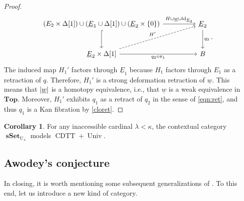 \documentclass[10pt,letterpaper,cm]{nupset}
\theoremstyle{definition}
\theoremstyle{theorem}
\newtheorem{corollary}[definition]{Corollary}
\theoremstyle{remark}
\newcommand{\0}{\mathbf{0}}
\newcommand{\1}{\mathbf{1}}
\newcommand{\2}{\mathbf{2}}
\DeclareMathOperator{\cdtt}{\mathrm{CDTT}}
\DeclareMathOperator{\univ}{\mathrm{Univ}}
\DeclareMathOperator{\sset}{\mathbf{sSet}}
\DeclareMathOperator{\idd}{id}
\begin{document}
\begin{proof}
\[\begin{tikzcd}[column sep=huge, row sep=large]
{\mleft(E_2\times \Delta[1]\mright)\cup \mleft(\underline{E}_1\cup \Delta[1]\mright)\cup \mleft(\underline{E}_2\times \mleft\{0\mright\}\mright)} \arrow[d, hook] \arrow[r, "H\cup \underline{w}\cup\idd_{\underline{E}_2}"] & \underline{E}_2 \arrow[d, "q_2"] \\
{\underline{E}_2\times \Delta[1]} \arrow[r, "q_2\circ \pi_1"'] \arrow[ru, "H'", dashed]                                                                                          & B                   
\end{tikzcd}
.\]
The induced map $H_1'$ factors through $\underline{E}_1$ because $H_1$ factors through $E_1$ as a retraction of $q$. Therefore, $H_1'$ is a strong deformation retraction of $\underline{w}$. This means that $\mleft\lvert{\underline{w}}\mright\rvert$ is a homotopy equivalence, i.e., that $\underline{w}$ is a weak equivalence in $\mathbf{Top}$. Moreover, $H_1'$ exhibits $q_1$ as a retract of $q_2$ in the sense of \eqref{eqn:ret}, and thus  $q_1$ is a Kan fibration by \cref{cloret}.


\begin{comment}
we have two diagonal fill-ins
\[
\begin{tikzcd}[row sep=large]
E_1 \arrow[d, "w"', hook] \arrow[r, equal]           & E_1 \arrow[d, "p_1"] &  & {E_2\cup \mleft(E_1\times \Delta[1]\mright)\cup E_2} \arrow[d, hook] \arrow[r] & E_2 \arrow[d] \\
E_2 \arrow[r, "p_2"'] \arrow[ru, "r", dashed] & A                    &  & {E_2\times \Delta[1]} \arrow[r] \arrow[ru, "H", dashed]                      & A            
\end{tikzcd}
,\] so that $r$ is a strong deformation retraction of $w$ (see \cref{defret}).
\end{comment}
\end{proof}

\smallskip

\begin{corollary}
For any inaccessible cardinal $\lambda < \kappa$, the contextual category $\sset_{\mathrm{U}_{\lambda}}$ models $\cdtt+\univ$.
\end{corollary}

\subsection*{Awodey's conjecture}

In closing, it is worth mentioning some subsequent generalizations of \cite{KL}.
To this end, let us introduce a new kind of category.
\end{document}
